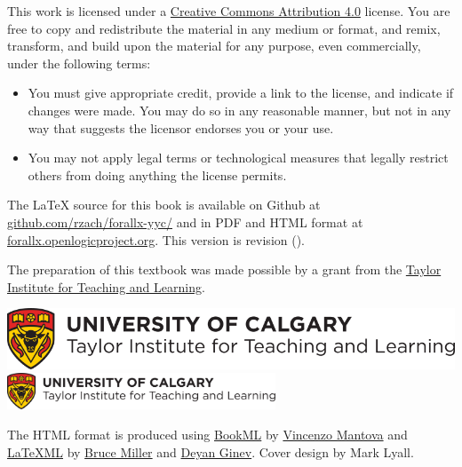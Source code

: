 \ifHTMLtarget\else
  \bigskip

  \noindent\footnotesize
\fi
This work is licensed under a \href{https://creativecommons.org/licenses/by/4.0/}{Creative Commons Attribution 4.0} license.
You are free to copy and redistribute the material in any medium or format, and  remix, transform, and build upon the material for any purpose, even commercially, under the following terms:
\begin{itemize}
\item You must give appropriate credit, provide a link to the license, and indicate if changes were made. You may do so in any reasonable manner, but not in any way that suggests the licensor endorses you or your use.
\item You may not apply legal terms or technological measures that legally restrict others from doing anything the license permits.
\end{itemize}

\ifHTMLtarget\else
\vfil\normalsize\noindent
\fi
The \LaTeX{} source for this book is available on Github at
\href{https://github.com/rzach/forallx-yyc/}{github.com/rzach/forallx-yyc/} and in PDF and
HTML format at
\href{https://forallx.openlogicproject.org}{forallx.openlogicproject.org}.
This version is revision \gitAbbrevHash{}
(\gitCommitterDate).

\bigskip
\noindent
The preparation of this textbook was made possible by a grant from the \href{https://taylorinstitute.ucalgary.ca/}{Taylor Institute for Teaching and Learning}.

\bigskip
\noindent
\href{https://taylorinstitute.ucalgary.ca/}{%
  \iflatexml
    \includegraphics[alt={Logo of the Taylor Institute for Teaching and Learning}]
      {assets/ti-color}
  \else
    \includegraphics[width=8cm]{assets/ti-color}
  \fi}

\ifHTMLtarget
The HTML format is produced using
\href{https://vlmantova.github.io/bookml/}{BookML} by
\href{https://eps.leeds.ac.uk/maths/staff/4058/dr-vincenzo-l-mantova}{Vincenzo Mantova}
and \href{https://dlmf.nist.gov/LaTeXML/}{\LaTeX{}ML} by
\href{https://www.nist.gov/people/bruce-r-miller}{Bruce Miller} and
\href{https://prodg.org/}{Deyan Ginev}. 
\else
\bigskip
\noindent Cover design by Mark Lyall.
\fi
